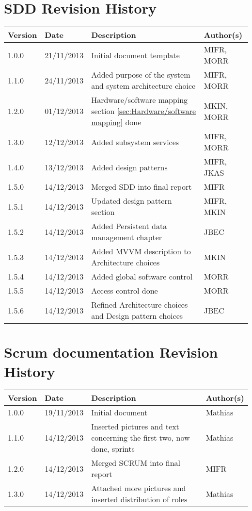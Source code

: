 \section{SDD Revision History}
\begin{center}
    \begin{tabular}{ | l | l | p{6cm} | p{4cm} |}
    \hline
    Version & Date & Description & Author(s) 
    \\ \hline
    1.0.0 & 21/11/2013 & Initial document template & MIFR, MORR
    \\ \hline
    1.1.0 & 24/11/2013 & Added purpose of the system and system architecture choice & MIFR, MORR
    \\ \hline
    1.2.0 & 01/12/2013 & Hardware/software mapping section \ref{sec:Hardware/software mapping} done & MKIN, MORR
    \\ \hline
    1.3.0 & 12/12/2013 & Added subsystem services & MIFR, MORR
    \\ \hline
    1.4.0 & 13/12/2013 & Added design patterns & MIFR, JKAS
    \\ \hline
    1.5.0 & 14/12/2013 & Merged SDD into final report & MIFR
    \\ \hline
    1.5.1 & 14/12/2013 & Updated design pattern section & MIFR, MKIN
    \\ \hline
    1.5.2 & 14/12/2013 & Added Persistent data management chapter & JBEC
    \\ \hline
    1.5.3 & 14/12/2013 & Added MVVM description to Architecture choices & MKIN
    \\ \hline
    1.5.4 & 14/12/2013 & Added global software control & MORR
    \\ \hline
    1.5.5 & 14/12/2013 & Access control done & MORR
    \\ \hline
    1.5.6 & 14/12/2013 & Refined Architecture choices and Design pattern choices & JBEC
    \\ \hline
    \end{tabular}
\end{center}

\section{Scrum documentation Revision History}
\begin{center}
    \begin{tabular}{ | l | l | p{6cm} | p{4cm} |}
    \hline
    Version & Date & Description & Author(s) 
    \\ \hline
    1.0.0 & 19/11/2013 & Initial document & Mathias
    \\ \hline
    1.1.0 & 14/12/2013 & Inserted pictures and text concerning the first two, now done, sprints & Mathias
    \\ \hline
    1.2.0 & 14/12/2013 & Merged SCRUM into final report & MIFR
    \\ \hline
    1.3.0 & 14/12/2013 & Attached more pictures and inserted distribution of roles & Mathias
    \\ \hline
    \end{tabular}
\end{center}